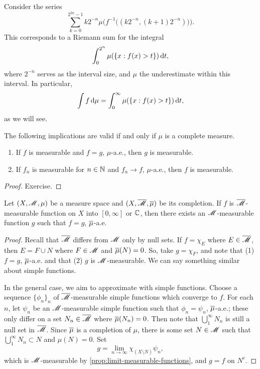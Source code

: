 \documentclass[12pt]{article} %
\begin{document}
\begin{remark}
    Consider the series
    \[\sum_{k=0}^{2^{2n} - 1} k2^{-n} \mu\Big( f^{-1}\Big((k2^{-n}, (k+1)2^{-n})\Big)\Big).\] This corresponds to a Riemann sum for the integral \[\int_0^{2^n} \mu(\{x : f(x) > t\}) \, \mathrm{d} t,\] where $2^{-n}$ serves as the interval size, and $\mu$ the underestimate within this interval. In particular, \[\int f \, \mathrm{d} \mu = \int_0^\infty \mu(\{x : f(x) > t\}) \, \mathrm{d} t,\] as we will see.
\end{remark} 

\begin{proposition}\label{prop:equal-ae-iff-complete-measure}
    The following implications are valid if and only if $\mu$ is a complete measure. \begin{enumerate}
        \item If $f$ is measurable and $f = g$, $\mu$-a.e., then $g$ is measurable.
        \item If $f_n$ is measurable for $n \in \mathbb{N}$ and $f_n \to f$, $\mu$-a.e., then $f$ is measurable.
    \end{enumerate}
\end{proposition}

\begin{proof}
    Exercise.
\end{proof}

\begin{proposition}\label{prop:equal-ae-function-complete-measure}
    Let $(X, \mathscr{M}, \mu)$ be a measure space and $(X, \overline{\mathscr{M}}, \overline{\mu})$ be its completion. If $f$ is $\overline{\mathscr{M}}$-measurable function on $X$ into $[0,\infty]$ or $ \mathbb{C}$, then there exists an $\mathscr{M}$-measurable function $g$ such that $f = g$, $\overline{\mu}$-a.e.
\end{proposition}

\begin{proof}
    Recall that $\overline{\mathscr{M}}$ differs from $\mathscr{M}$ only by null sets. If $f = \chi_E$ where $E \in \overline{\mathscr{M}}$, then $E = F \cup N$ where $F \in \mathscr{M}$ and $\overline{\mu}(N) = 0$. So, take $g = \chi_F$, and note that (1) $f = g$, $\overline{\mu}$-a.e. and that (2) $g$ is $\mathscr{M}$-measurable. We can say something similar about simple functions. 

    In the general case, we aim to approximate with simple functions. Choose a sequence $\{\phi_n\}_n$ of $\overline{\mathscr{M}}$-measurable simple functions which converge to $f$. For each $n$, let $\psi_n$ be an $\mathscr{M}$-measurable simple function such that $\phi_n = \psi_n$, $\overline{\mu}$-a.e.; these only differ on a set $N_n \in \overline{\mathscr{M}}$ where $\overline{\mu}(N_n) = 0$. Then note that $\bigcup_1^\infty N_n$ is still a null set in $\overline{\mathscr{M}}$. Since $\overline{\mu}$ is a completion of $\mu$, there is some set $N \in \mathscr{M}$ such that $\bigcup_1^\infty N_n \subset N$ and $\mu(N) = 0$. Set \[g = \lim_{n \to \infty} \chi_{(X \setminus N)} \psi_n,\] which is $\mathscr{M}$-measurable by \cref{prop:limit-measurable-functions}, and $g = f$ on $N^c$.
\end{proof}
\end{document}
